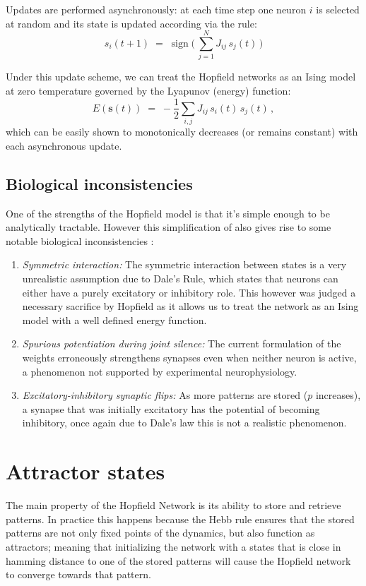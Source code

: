 \documentclass[a4paper,12pt]{report}
\begin{document}
Updates are performed asynchronously: at each time step one neuron \(i\) is selected 
at random and its state is updated according via the rule:
\begin{equation}
  s_i(t+1)\;=\;\operatorname{sign}\bigl(\,\sum_{j=1}^N J_{ij}\,s_j(t)\,\bigr)
\end{equation}

Under this update scheme, we can treat the Hopfield networks as an Ising model at zero
temperature governed by the Lyapunov (energy) function:
\begin{equation}\label{eq:energy}
E(\mathbf{s}\left(t\right))
\;=\;
- \frac{1}{2} \sum_{i,j} J_{ij}\,s_i\left(t\right)\,s_j\left(t\right)\,,
\end{equation}
which can be easily shown to monotonically decreases (or remains constant) with each 
asynchronous update.
\vspace*{0.5em}

\subsection*{Biological inconsistencies}
One of the strengths of the Hopfield model is that it's simple enough to be analytically
tractable. However this simplification of also gives rise to some notable biological 
inconsistencies \cite{Hertz2018}:
\begin{enumerate}
  \item\emph{Symmetric interaction:}  The symmetric interaction between states is a very 
  unrealistic assumption due to Dale's Rule, which states that neurons can either have 
  a purely excitatory or inhibitory role. This however was judged a necessary sacrifice
  by Hopfield as it allows us to treat the network as an Ising model with a well defined
  energy function.
  \item \emph{Spurious potentiation during joint silence:}  The current formulation 
  of the weights erroneously strengthens synapses even when neither neuron is active, 
  a phenomenon not supported by experimental neurophysiology.
  \item \emph{Excitatory-inhibitory synaptic flips:}  As more patterns are 
  stored (\(p\) increases), a synapse that was initially excitatory has the potential of
  becoming inhibitory, once again due to Dale's law this is not a realistic phenomenon.
\end{enumerate}

\section{Attractor states}
The main property of the Hopfield Network is its ability to store and retrieve patterns.
In practice this happens because the Hebb rule ensures that the stored patterns are not
only fixed points of the dynamics, but also function as attractors; meaning that 
initializing the network with a states that is close in hamming distance to one of the
stored patterns will cause the Hopfield network to converge towards that pattern.
\vspace{0.5em}
\end{document}
